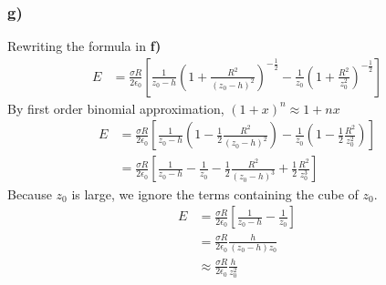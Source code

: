 \documentclass[../homework.tex]{subfiles}
\begin{document}
\subsubsection*{g)}
\indent \indent Rewriting the formula in \textbf{f)}
\begin{align*}
    E & = \frac{\sigma R}{2\epsilon_0} \left[
        \frac{1}{z_0 - h} \left(1 + \frac{R^2}{(z_0 - h)^2}\right)^{-\frac{1}{2}} - \frac{1}{z_0} \left(1 + \frac{R^2}{z_0^2}\right)^{-\frac{1}{2}}
    \right]
\end{align*}
\indent By first order binomial approximation, $(1 + x)^n \approx 1 + nx$
\begin{align*}
    E & = \frac{\sigma R}{2\epsilon_0} \left[
        \frac{1}{z_0 - h} \left(1 - \frac{1}{2}\frac{R^2}{(z_0 - h)^2}\right) - \frac{1}{z_0} \left(1 - \frac{1}{2}\frac{R^2}{z_0^2}\right)
    \right] \\[10pt]
      &= \frac{\sigma R}{2\epsilon_0} \left[
        \frac{1}{z_0 - h} - \frac{1}{z_0} - \frac{1}{2}\frac{R^2}{(z_0 - h)^3} + \frac{1}{2} \frac{R^2}{z_0^3}
    \right]
\end{align*}
\indent Because $z_0$ is large, we ignore the terms containing the cube of $z_0$. 
\begin{align*}
    E & = \frac{\sigma R}{2\epsilon_0} \left[
        \frac{1}{z_0 - h} - \frac{1}{z_0}
    \right] \\[10pt]
      & = \frac{\sigma R}{2\epsilon_0} \frac{h}{(z_0 - h) z_0} \\[10pt]
      & \approx \frac{\sigma R}{2\epsilon_0} \frac{h}{z_0^2}
\end{align*}
\end{document}
